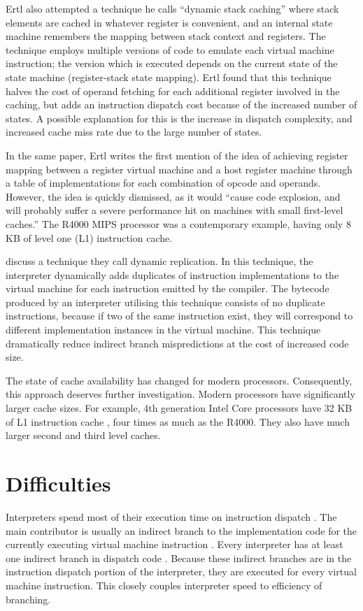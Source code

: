 		Ertl also attempted a technique he calls ``dynamic stack caching'' where stack elements are cached in whatever register is convenient, and an internal state machine remembers the mapping between stack context and registers. The technique employs multiple versions of code to emulate each virtual machine instruction; the version which is executed depends on the current state of the state machine (register-stack state mapping). Ertl found that this technique halves the cost of operand fetching for each additional register involved in the caching, but adds an instruction dispatch cost because of the increased number of states. A possible explanation for this is the increase in dispatch complexity, and increased cache miss rate due to the large number of states.
		
		In the same paper, Ertl writes the first mention of the idea of achieving register mapping between a register virtual machine and a host register machine through a table of implementations for each combination of opcode and operands. However, the idea is quickly dismissed, as it would ``cause code explosion, and will probably suffer a severe performance hit on machines with small first-level caches.'' The R4000 MIPS processor was a contemporary example, having only 8 KB of level one (L1) instruction cache.
		
		\cite{optimizingindirectbranch} discuss a technique they call dynamic replication. In this technique, the interpreter dynamically adds duplicates of instruction implementations to the virtual machine for each instruction emitted by the compiler. The bytecode produced by an interpreter utilising this technique consists of no duplicate instructions, because if two of the same instruction exist, they will correspond to different implementation instances in the virtual machine. This technique dramatically reduce indirect branch mispredictions at the cost of increased code size.
	
		The state of cache availability has changed for modern processors. Consequently, this approach deserves further investigation. Modern processors have significantly larger cache sizes. For example, 4th generation Intel Core processors have 32 KB of L1 instruction cache \citep{optimisationreference}, four times as much as the R4000. They also have much larger second and third level caches.
		
	
		
	\section{Difficulties}
		Interpreters spend most of their execution time on instruction dispatch \citep{modernarchvm}. The main contributor is usually an indirect branch to the implementation code for the currently executing virtual machine instruction \citep{optimizingindirectbranch}. Every interpreter has at least one indirect branch in dispatch code \citep{modernarchvm}. Because these indirect branches are in the instruction dispatch portion of the interpreter, they are executed for every virtual machine instruction. This closely couples interpreter speed to efficiency of branching.
		
